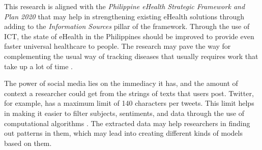 
This research is aligned with the \textit{Philippine eHealth Strategic Framework and Plan 2020} that may help in strengthening existing eHealth solutions through adding to the \textit{Information Sources} pillar of the framework. Through the use of ICT, the state of eHealth in the Philippines should be improved to provide even faster universal healthcare to people. The research may pave the way for complementing the usual way of tracking diseases that usually requires work that take up a lot of time \cite{gomide2011dengue}. 


The power of social media lies on the immediacy it has, and the amount of context a researcher could get from the strings of texts that users post. Twitter, for example, has a maximum limit of 140 characters per tweets. This limit helps in making it easier to filter subjects, sentiments, and data through the use of computational algorithms \cite{schmidt2012trending}. The extracted data may help researchers in finding out patterns in them, which may lead into creating different kinds of models based on them.


